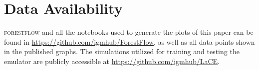 \documentclass{aa}
\newcommand{\forestflow}{\textsc{forestflow}\xspace}
\begin{document}
\section*{Data Availability}

\forestflow and all the notebooks used to generate the plots of this paper can be found in \url{https://github.com/igmhub/ForestFlow}, as well as all data points shown in the published graphs. The simulations utilized for training and testing the emulator are publicly accessible at \url{https://github.com/igmhub/LaCE}.





\end{document}
